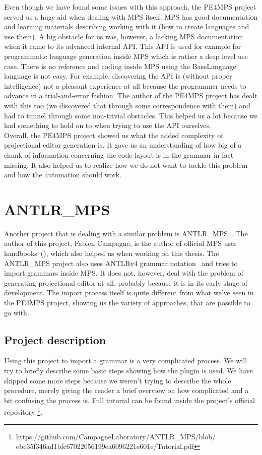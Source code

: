 Even though we have found some issues with this approach, the PE4MPS project served us a huge aid when dealing with MPS itself.
MPS has good documentation and learning materials describing working with it (how to create languages and use them).
A big obstacle for us was, however, a lacking MPS documentation when it came to its advanced internal API.
This API is used for example for programmatic language generation inside MPS which is rather a deep level use case.
There is no reference and coding inside MPS using the BaseLanguage language is not easy.
For example, discovering the API is (without proper intelligence) not a pleasant experience at all because the programmer needs to advance in a trial-and-error fashion.
The author of the PE4MPS project has dealt with this too (we discovered that through some correspondence with them) and had to tunnel through some non-trivial obstacles.
This helped us a lot because we had something to hold on to when trying to use the API ourselves.
\\

Overall, the PE4MPS project showed us what the added complexity of projectional editor generation is.
It gave us an understanding of how big of a chunk of information concerning the code layout is in the grammar in fact missing.
It also helped us to realize how we do not want to tackle this problem and how the automation should work.

\section{ANTLR{\_}MPS}
Another project that is dealing with a similar problem is ANTLR{\_}MPS~\cite{ANTLR2MPS}.
The author of this project, Fabien Campagne, is the author of official MPS user handbooks~(\cite{MPS1}\cite{MPS2}), which also helped us when working on this thesis.
The ANTLR{\_}MPS project also uses ANTLRv4 grammar notation~\cite{ANTLR4} and tries to import grammars inside MPS.
It does not, however, deal with the problem of generating projectional editor at all, probably because it is in its early stage of development.
The import process itself is quite different from what we've seen in the PE4MPS project, showing us the variety of approaches, that are possible to go with.

\subsection{Project description}
Using this project to import a grammar is a very complicated process.
We will try to briefly describe some basic steps showing how the plugin is used.
We have skipped some more steps because we weren't trying to describe the whole procedure, merely giving the reader a brief overview on how complicated and a bit confusing the process is.
Full tutorial can be found inside the project's official repository \footnote{https://github.com/CampagneLaboratory/ANTLR{\_}MPS/blob/ ebc35f346ad1bfc67022056199ea6096221e601e/Tutorial.pdf}.
\\

